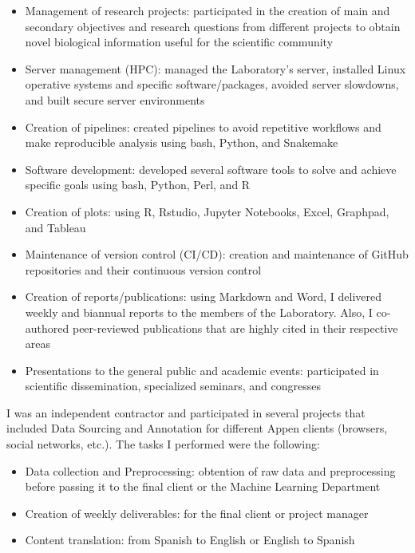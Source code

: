 \documentclass[11pt,a4paper,]{awesome-cv}
\providecommand{\tightlist}{%
	\setlength{\itemsep}{0pt}\setlength{\parskip}{0pt}}
\begin{document}
\begin{itemize}
\tightlist
\item
  Management of research projects: participated in the creation of main
  and secondary objectives and research questions from different
  projects to obtain novel biological information useful for the
  scientific community
\item
  Server management (HPC): managed the Laboratory's server, installed
  Linux operative systems and specific software/packages, avoided server
  slowdowns, and built secure server environments
\item
  Creation of pipelines: created pipelines to avoid repetitive workflows
  and make reproducible analysis using bash, Python, and Snakemake
\item
  Software development: developed several software tools to solve and
  achieve specific goals using bash, Python, Perl, and R
\item
  Creation of plots: using R, Rstudio, Jupyter Notebooks, Excel,
  Graphpad, and Tableau
\item
  Maintenance of version control (CI/CD): creation and maintenance of
  GitHub repositories and their continuous version control
\item
  Creation of reports/publications: using Markdown and Word, I delivered
  weekly and biannual reports to the members of the Laboratory. Also, I
  co-authored peer-reviewed publications that are highly cited in their
  respective areas
\item
  Presentations to the general public and academic events: participated
  in scientific dissemination, specialized seminars, and congresses
\end{itemize}

\begin{cventries}
    \vspace{-4.0mm}
\end{cventries}

I was an independent contractor and participated in several projects
that included Data Sourcing and Annotation for different Appen clients
(browsers, social networks, etc.). The tasks I performed were the
following:

\begin{itemize}
\tightlist
\item
  Data collection and Preprocessing: obtention of raw data and
  preprocessing before passing it to the final client or the Machine
  Learning Department
\item
  Creation of weekly deliverables: for the final client or project
  manager
\item
  Content translation: from Spanish to English or English to Spanish
\end{itemize}
\end{document}
